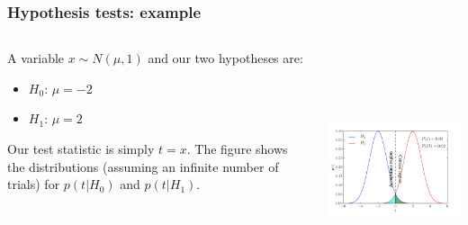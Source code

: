 \begin{frame}

\frametitle{Hypothesis tests: example}
\label{hypothesistests:example}

\begin{columns}
    \begin{column}{0.35\textwidth}

A variable $x \sim N(\mu, 1)$ and our two hypotheses are:

\begin{itemize}
\item $H_0$: $\mu = -2$

\item $H_1$: $\mu = 2$

\end{itemize}

Our test statistic is simply $t=x$. The figure shows the
distributions (assuming an infinite number of trials) for $p(t|H_0)$ and $p(t|H_1)$.
\end{column}
    \begin{column}{0.65\textwidth}
\includegraphics[keepaspectratio,width=\textwidth,height=200pt]{figures/hypothesis_test.pdf}
\end{column}
\end{columns}

\end{frame}

